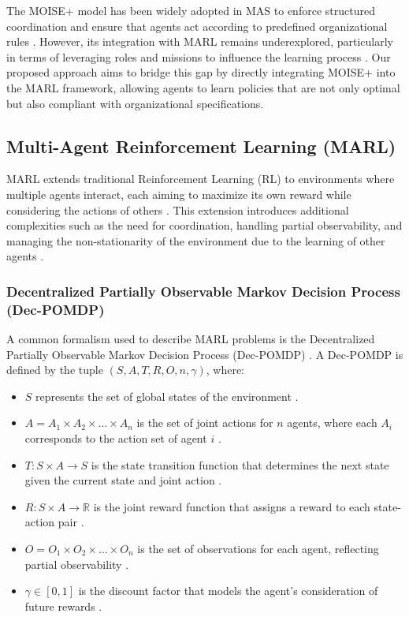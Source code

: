 \documentclass[sigconf,anonymous]{aamas}
\begin{document}

The MOISE+ model has been widely adopted in MAS to enforce structured coordination and ensure that agents act according to predefined organizational rules \cite{hubner2010moise}. However, its integration with MARL remains underexplored, particularly in terms of leveraging roles and missions to influence the learning process \cite{hernandez2019survey}. Our proposed approach aims to bridge this gap by directly integrating MOISE+ into the MARL framework, allowing agents to learn policies that are not only optimal but also compliant with organizational specifications.

\subsection{Multi-Agent Reinforcement Learning (MARL)}
MARL extends traditional Reinforcement Learning (RL) to environments where multiple agents interact, each aiming to maximize its own reward while considering the actions of others \cite{foerster2016learning, lowe2017multi}. This extension introduces additional complexities such as the need for coordination, handling partial observability, and managing the non-stationarity of the environment due to the learning of other agents \cite{hernandez2019survey, yang2018mean}.

\subsubsection{Decentralized Partially Observable Markov Decision Process (Dec-POMDP)}
A common formalism used to describe MARL problems is the Decentralized Partially Observable Markov Decision Process (Dec-POMDP) \cite{oliehoek2016concise}. A Dec-POMDP is defined by the tuple $(S, A, T, R, O, n, \gamma)$, where:

\begin{itemize}
    \item $S$ represents the set of global states of the environment \cite{oliehoek2016concise}.
    \item $A = A_1 \times A_2 \times \ldots \times A_n$ is the set of joint actions for $n$ agents, where each $A_i$ corresponds to the action set of agent $i$ \cite{foerster2018counterfactual}.
    \item $T: S \times A \rightarrow S$ is the state transition function that determines the next state given the current state and joint action \cite{foerster2016learning}.
    \item $R: S \times A \rightarrow \mathbb{R}$ is the joint reward function that assigns a reward to each state-action pair \cite{lowe2017multi}.
    \item $O = O_1 \times O_2 \times \ldots \times O_n$ is the set of observations for each agent, reflecting partial observability \cite{oliehoek2016concise}.
    \item $\gamma \in [0,1]$ is the discount factor that models the agent's consideration of future rewards \cite{foerster2018counterfactual}.
\end{itemize}
\end{document}
